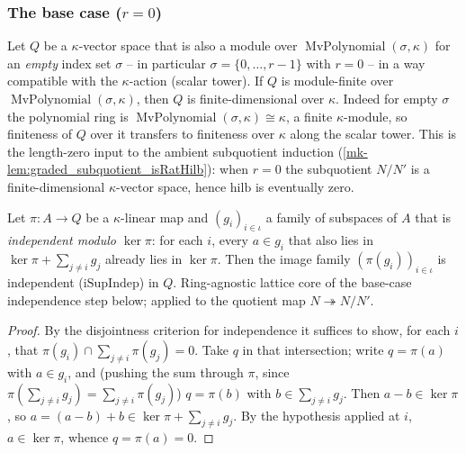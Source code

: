 \subsubsection*{The base case ($r = 0$)}

\begin{lemma}\label{mk-lem:graded_finiteDimensional_of_mvPolynomial_isEmpty_finite}
  \leanok

  Let \(Q\) be a \(\kappa\)-vector space that is also a module over
  \(\operatorname{MvPolynomial}(\sigma, \kappa)\) for an \emph{empty} index set
  \(\sigma\) -- in particular \(\sigma = \{0, \dots, r-1\}\) with \(r = 0\) -- in a way
  compatible with the \(\kappa\)-action (scalar tower). If \(Q\) is module-finite over
  \(\operatorname{MvPolynomial}(\sigma, \kappa)\), then \(Q\) is finite-dimensional over
  \(\kappa\). Indeed for empty \(\sigma\) the polynomial ring is
  \(\operatorname{MvPolynomial}(\sigma, \kappa) \cong \kappa\), a finite \(\kappa\)-module,
  so finiteness of \(Q\) over it transfers to finiteness over \(\kappa\) along the scalar
  tower. This is the length-zero input to the ambient subquotient induction
  (\ref{mk-lem:graded_subquotient_isRatHilb}): when \(r = 0\) the subquotient \(N/N'\) is a
  finite-dimensional \(\kappa\)-vector space, hence \(\mathrm{hilb}\) is eventually zero.
\end{lemma}

\begin{lemma}\label{mk-lem:graded_iSupIndep_map_of_mem_ker_sup}
  \leanok

  Let \(\pi : A \to Q\) be a \(\kappa\)-linear map and \((g_i)_{i \in \iota}\) a family of
  subspaces of \(A\) that is \emph{independent modulo \(\ker\pi\)}: for each \(i\), every
  \(a \in g_i\) that also lies in \(\ker\pi + \sum_{j \ne i} g_j\) already lies in
  \(\ker\pi\). Then the image family \((\pi(g_i))_{i \in \iota}\) is independent
  (\(\mathrm{iSupIndep}\)) in \(Q\). Ring-agnostic lattice core of the base-case
  independence step below; applied to the quotient map \(N \twoheadrightarrow N/N'\).
\end{lemma}
\begin{proof}
  \leanok

By the disjointness criterion for independence it suffices to show, for each \(i\),
  that \(\pi(g_i) \cap \sum_{j \ne i} \pi(g_j) = 0\). Take \(q\) in that intersection;
  write \(q = \pi(a)\) with \(a \in g_i\), and (pushing the sum through \(\pi\), since
  \(\pi(\sum_{j\ne i} g_j) = \sum_{j\ne i}\pi(g_j)\)) \(q = \pi(b)\) with
  \(b \in \sum_{j \ne i} g_j\). Then \(a - b \in \ker\pi\), so
  \(a = (a-b) + b \in \ker\pi + \sum_{j \ne i} g_j\). By the hypothesis applied at \(i\),
  \(a \in \ker\pi\), whence \(q = \pi(a) = 0\).
\end{proof}

